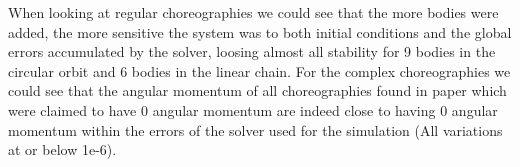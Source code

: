 \documentclass[11pt]{article}
\begin{document}
\smallskip

When looking at regular choreographies we could see that the more bodies were added, the more sensitive the system was to both initial conditions and the global errors accumulated by the solver, loosing almost all stability for 9 bodies in the circular orbit and 6 bodies in the linear chain. For the complex choreographies we could see that the angular momentum of all choreographies found in paper \cite{ComplexNbody} which were claimed to have 0 angular momentum are indeed close to having 0 angular momentum within the errors of the solver used for the simulation (All variations at or below 1e-6).









\newpage
\end{document}
